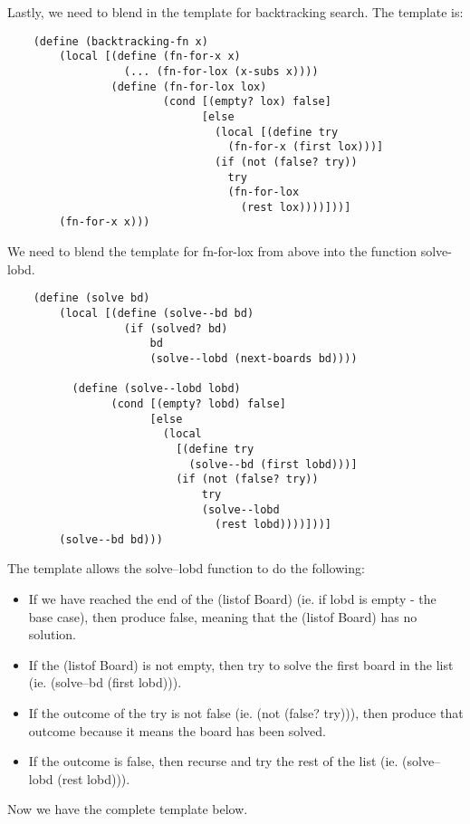 \documentclass[11pt,a4paper]{report}
\begin{document}
	Lastly, we need to blend in the template for backtracking search. The template is:
	
	\begin{verbatim}
	(define (backtracking-fn x)
		(local [(define (fn-for-x x)
		          (... (fn-for-lox (x-subs x))))
		        (define (fn-for-lox lox)
		                (cond [(empty? lox) false]
		                      [else
		                        (local [(define try 
		                          (fn-for-x (first lox)))]
		                        (if (not (false? try))
		                          try
		                          (fn-for-lox 
		                            (rest lox))))]))]
		(fn-for-x x)))
	\end{verbatim}
	
	We need to blend the template for fn-for-lox from above into the function solve-lobd.
	
	\begin{verbatim}
	(define (solve bd)
		(local [(define (solve--bd bd)
		          (if (solved? bd)
		              bd
		              (solve--lobd (next-boards bd))))
		              
		  (define (solve--lobd lobd)
		        (cond [(empty? lobd) false]
		              [else
		                (local 
		                  [(define try 
		                    (solve--bd (first lobd)))]
		                  (if (not (false? try))
		                      try
		                      (solve--lobd 
		                        (rest lobd))))]))]
		(solve--bd bd)))
	\end{verbatim}
	
	The template allows the solve--lobd function to do the following:
	\begin{itemize}
		\item If we have reached the end of the (listof Board) (ie. if lobd is empty - the base case), then
		produce false, meaning that the (listof Board) has no solution.
		\item If the (listof Board) is not empty, then try to solve the first board in the list (ie. (solve--bd
		(first lobd))).
		\item If the outcome of the try is not false (ie. (not (false? try))), then produce that outcome
		because it means the board has been solved.
		\item If the outcome is false, then recurse and try the rest of the list (ie. (solve--lobd (rest
		lobd))).
	\end{itemize}
	
	Now we have the complete template below.
	
\end{document}
